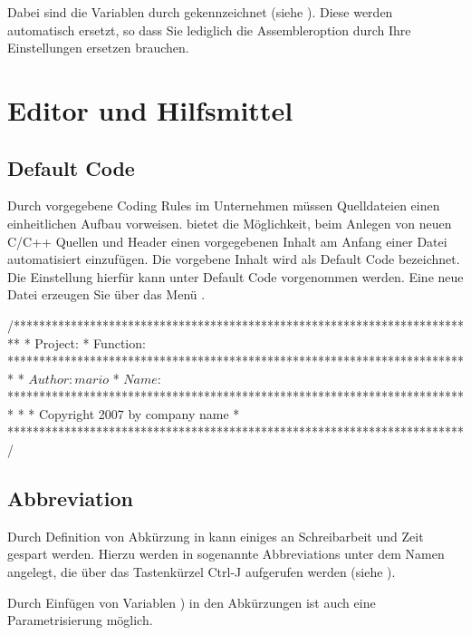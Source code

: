 Dabei sind die \codeblocks Variablen durch \codeline{$} gekennzeichnet (siehe ). Diese werden automatisch ersetzt, so dass Sie lediglich die Assembleroption  durch Ihre Einstellungen ersetzen brauchen.

\section{Editor und Hilfsmittel}

\subsection{Default Code}

Durch vorgegebene Coding Rules im Unternehmen müssen Quelldateien einen einheitlichen Aufbau vorweisen. \codeblocks bietet die Möglichkeit, beim Anlegen von neuen C/C++ Quellen und Header einen vorgegebenen Inhalt am Anfang einer Datei automatisiert einzufügen. Die vorgebene Inhalt wird als Default Code bezeichnet. Die Einstellung hierfür kann unter  Default Code vorgenommen werden. Eine neue Datei erzeugen Sie über das Menü .


\begin{code}
/*************************************************************************
 *  Project:
 *  Function:
 *************************************************************************
 *  $Author: mario $
 *  $Name:  $
 *************************************************************************
 *
 *  Copyright 2007 by company name
 *
 ************************************************************************/
\end{code}

\subsection{Abbreviation}\label{sec:abbreviation}

Durch Definition von Abkürzung in \codeblocks kann einiges an Schreibarbeit und Zeit gespart werden. Hierzu werden in  sogenannte Abbreviations unter dem Namen  angelegt, die über das Tastenkürzel Ctrl-J aufgerufen werden (siehe ).


Durch Einfügen von Variablen ) in den Abkürzungen ist auch eine Parametrisierung möglich.

